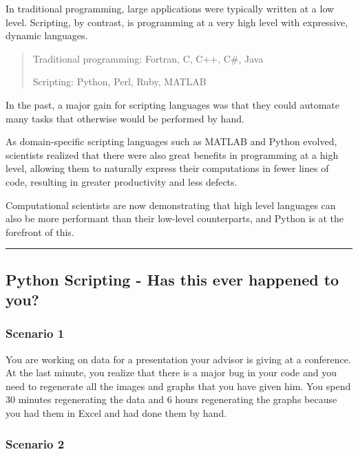\documentclass{article}
\begin{document}
In traditional programming, large applications were typically written at
a low level. Scripting, by contrast, is programming at a very high level
with expressive, dynamic languages.

\begin{quote}
Traditional programming: Fortran, C, C++, C\#, Java

Scripting: Python, Perl, Ruby, MATLAB
\end{quote}

In the past, a major gain for scripting languages was that they could
automate many tasks that otherwise would be performed by hand.

As domain-specific scripting languages such as MATLAB and Python
evolved, scientists realized that there were also great benefits in
programming at a high level, allowing them to naturally express their
computations in fewer lines of code, resulting in greater productivity
and less defects.

Computational scientists are now demonstrating that high level languages
can also be more performant than their low-level counterparts, and
Python is at the forefront of this.

    \begin{center}\rule{3in}{0.4pt}\end{center}

\subsection{Python Scripting - Has this ever happened to
you?}\label{python-scripting---has-this-ever-happened-to-you}

\subsubsection{Scenario 1}\label{scenario-1}

You are working on data for a presentation your advisor is giving at a
conference. At the last minute, you realize that there is a major bug in
your code and you need to regenerate all the images and graphs that you
have given him. You spend 30 minutes regenerating the data and 6 hours
regenerating the graphs because you had them in Excel and had done them
by hand.

\subsubsection{Scenario 2}\label{scenario-2}
\end{document}

